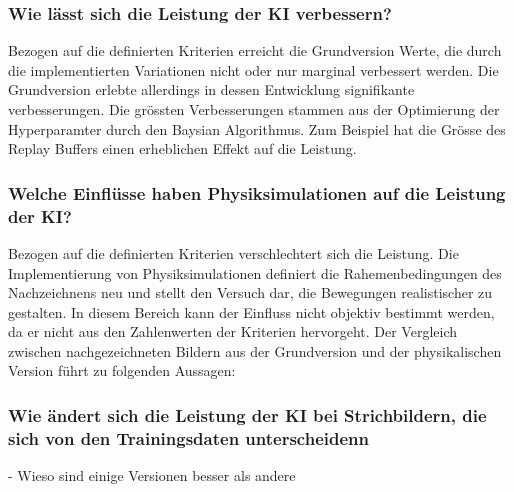 \subsubsection*{Wie lässt sich die Leistung der KI verbessern?}
Bezogen auf die definierten Kriterien erreicht die Grundversion Werte, die
durch die implementierten Variationen nicht oder nur marginal verbessert
werden. Die Grundversion erlebte allerdings in dessen Entwicklung
signifikante verbesserungen. Die grössten Verbesserungen stammen aus der
Optimierung der Hyperparamter durch den Baysian Algorithmus. Zum Beispiel
hat die Grösse des Replay Buffers einen erheblichen Effekt auf die Leistung.



\subsubsection*{Welche Einflüsse haben Physiksimulationen auf die Leistung der KI?}
Bezogen auf die definierten Kriterien verschlechtert sich die Leistung. Die
Implementierung von Physiksimulationen definiert die Rahemenbedingungen des
Nachzeichnens neu und stellt den Versuch dar, die Bewegungen realistischer zu
gestalten. In diesem Bereich kann der Einfluss nicht objektiv bestimmt werden,
da er nicht aus den Zahlenwerten der Kriterien hervorgeht. Der Vergleich
zwischen nachgezeichneten Bildern aus der Grundversion und der physikalischen Version führt zu
folgenden Aussagen:


\subsubsection*{Wie ändert sich die Leistung der KI bei Strichbildern, die sich von den Trainingsdaten unterscheidenn}
- Wieso sind einige Versionen besser als andere %

